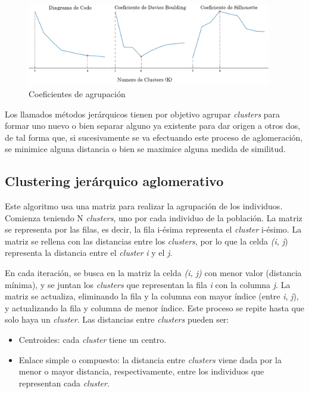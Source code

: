 	\begin{figure}[!h]
		\centering
		\includegraphics[width=0.95\textwidth]{images/chapter_2/ap_nosup_diagramas}
		\caption{Coeficientes de agrupación}
		\label{fig:coeficientes}
	\end{figure}
	


	Los llamados métodos jerárquicos \cite{ackermann2014analysis} tienen por objetivo agrupar \textit{clusters} para formar uno nuevo o bien separar alguno ya existente para dar origen a otros dos, de tal forma que, si sucesivamente se va efectuando este proceso de aglomeración, se minimice alguna distancia o bien se maximice alguna medida de similitud.

	\subsection{Clustering jerárquico aglomerativo}

		Este algoritmo usa una matriz para realizar la agrupación de los individuos. Comienza teniendo N \textit{clusters}, uno por cada individuo de la población. La matriz se representa por las filas, es decir, la fila i-ésima representa el \textit{cluster} i-ésimo. La matriz se rellena con las distancias entre los \textit{clusters}, por lo que la celda \textit{(i, j}) representa la distancia entre el \textit{cluster} \textit{i} y el \textit{j}.  
		
		En cada iteración, se busca en la matriz la celda \textit{(i, j)} con menor valor (distancia mínima), y se juntan los \textit{clusters} que representan la fila \textit{i} con la columna \textit{j}. La matriz se actualiza, eliminando la fila y la columna con mayor índice (entre \textit{i}, \textit{j}), y actualizando la fila y columna de menor índice. Este proceso se repite hasta que solo haya un \textit{cluster}. Las distancias entre \textit{clusters} pueden ser:
		\begin{itemize}
		\vspace{-0.25cm}
		\item Centroides: cada \textit{cluster} tiene un centro.
		\vspace{-0.25cm}
		\item Enlace simple o compuesto: la distancia entre \textit{clusters} viene dada por la menor o mayor distancia, respectivamente, entre los individuos que representan cada \textit{cluster}.
		\vspace{-0.30cm}
		\end{itemize}



